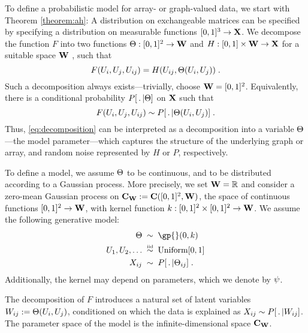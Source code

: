 To define a probabilistic model for array- or graph-valued data, we start with Theorem \ref{theorem:ah}: A distribution on exchangeable matrices
can be specified by specifying a distribution on measurable functions $[0,1]^3\rightarrow\mathbf{X}$. 
We decompose the function $F$ into two functions 
${\Theta:[0,1]^2\rightarrow\mathbf{W}}$ 
and ${H:[0,1]\times\mathbf{W}\rightarrow\mathbf{X}}$ for a suitable space $\mathbf{W}$ , such that
\begin{equation}
  \label{eq:decomposition}
  F(U_i,U_j,U_{ij})=H(U_{ij},\Theta(U_i,U_j))\;.
\end{equation}
Such a decomposition always exists---trivially, choose $\mathbf{W}=[0,1]^2$.
Equivalently, there is a conditional probability $P[\,.\,|\Theta]$ on $\mathbf{X}$ such that
\begin{equation}
  \label{eq:decomposition:sampling}
  F(U_i,U_j,U_{ij})\sim P[\,.\,|\Theta(U_i,U_j)]\;.
\end{equation}
Thus, \eqref{eq:decomposition} can be interpreted as a decomposition into a variable $\Theta$---the model parameter---which captures the structure of the underlying graph or array,
and random noise represented by $H$ or $P$, respectively.

To define a model, we assume $\Theta$ to be continuous, and to be distributed according to a Gaussian process. More precisely,
we set ${\mathbf{W} = \mathbb{R}}$ and consider a zero-mean Gaussian process on 
$\mathbf{C}_{\mathbf{W}}:=\mathbf{C}([0,1]^2,\mathbf{W})$, the space of continuous functions $[0,1]^2\rightarrow\mathbf{W}$,
with kernel function 
${k:[0,1]^2\times[0,1]^2\rightarrow\mathbf{W}}$.
We assume the following generative model:
\begin{equation}
  \label{eq:model}
  \begin{split}
    \AHfunction\; &\sim\; \gp{}(0,\kernel) \\
    \AHvar_{1},\AHvar_{2},\ldots\; &\simiid\; \Uniform[0,1] \\
    \darray_{ij}\; &\sim\; \likelihood[\,.\,|\AHfunction_{ij}] \;.
  \end{split}
\end{equation}
Additionally, the kernel may depend on parameters, which we denote by $\psi$.

The decomposition of $F$ introduces a natural set of latent variables $W_{ij}:=\Theta(U_i,U_j)$, conditioned on which the data is explained as $X_{ij}\sim P[\,.\,|W_{ij}]$. 
The parameter space of the model is the infinite-dimensional space $\mathbf{C}_{\mathbf{W}}$.

